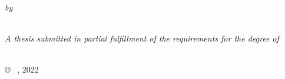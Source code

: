 \begin{titlepage}
    \begin{center}
        
        \vspace*{3cm}
        {\huge \bfseries \ttitle\par}\vspace{0.4cm} %

        \begin{minipage}[t]{0.4\textwidth}
            \begin{center} \large
                \large \emph{by} \\
                \LARGE \href{https://github.com/uduse/}{\authorname} %
            \end{center}
        \end{minipage} \\[4cm]
        
        \large \textit{A thesis submitted in partial fulfillment of the requirements for the degree of }
        \\[0.3cm]
        \LARGE \degreename \\[3cm]

        {\LARGE \deptname} \par
        {\LARGE \univname \par}\vspace{1.0cm}

        \vfill
        {\large \copyright ~ \authorname, 2022} \\[1cm]
    \end{center}
\end{titlepage}